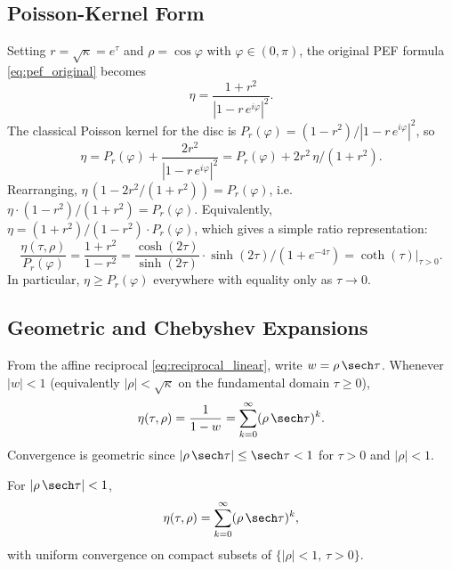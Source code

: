 \subsection{Poisson-Kernel Form}

Setting $r = \sqrt{\kappa} = e^{\tau}$ and $\rho = \cos\varphi$ with $\varphi \in (0,\pi)$, the original PEF formula \cref{eq:pef_original} becomes
\begin{equation}
  \eta = \frac{1 + r^{2}}{|1 - r\,e^{i\varphi}|^{2}}.
  \label{eq:poisson_form}
\end{equation}
The classical Poisson kernel for the disc is $P_{r}(\varphi) = (1-r^{2})/|1-r\,e^{i\varphi}|^{2}$, so
\begin{equation}
  \eta = P_{r}(\varphi) + \frac{2r^{2}}{|1-r\,e^{i\varphi}|^{2}}
       = P_{r}(\varphi) + 2r^{2}\,\eta/(1+r^{2}).
  \label{eq:poisson_decomposition}
\end{equation}
Rearranging, $\eta\,(1-2r^{2}/(1+r^{2})) = P_{r}(\varphi)$, i.e.\ $\eta \cdot (1-r^{2})/(1+r^{2}) = P_{r}(\varphi)$.  Equivalently, $\eta = (1+r^{2})/(1-r^{2})\cdot P_{r}(\varphi)$, which gives a simple ratio representation:
\begin{equation}
  \frac{\eta(\tau,\rho)}{P_{r}(\varphi)}
  = \frac{1+r^{2}}{1-r^{2}}
  = \frac{\cosh(2\tau)}{\sinh(2\tau)}\cdot\sinh(2\tau)/(1+e^{-4\tau})
  = \coth(\tau)\big|_{\tau>0}.
  \label{eq:eta_poisson_ratio}
\end{equation}
In particular, $\eta \ge P_{r}(\varphi)$ everywhere with equality only as $\tau \to 0$.

\subsection{Geometric and Chebyshev Expansions}
\label{sec:chebyshev}

From the affine reciprocal \cref{eq:reciprocal_linear}, write $w = \rho\,\sech\tau$.  Whenever $|w| < 1$ (equivalently $|\rho| < \sqrt{\kappa}$ on the fundamental domain $\tau \ge 0$),
\begin{equation}
  \eta(\tau,\rho)
  = \frac{1}{1-w}
  = \sum_{k=0}^{\infty}(\rho\,\sech\tau)^{k}.
  \label{eq:geometric_series}
\end{equation}
Convergence is geometric since $|\rho\,\sech\tau| \le \sech\tau < 1$ for $\tau > 0$ and $|\rho| < 1$.

\begin{proposition}
\label{prop:geometric_series}
For $|\rho\,\sech\tau| < 1$,
\begin{equation}
  \eta(\tau,\rho) = \sum_{k=0}^{\infty}(\rho\,\sech\tau)^{k},
  \label{eq:chebyshev_exp}
\end{equation}
with uniform convergence on compact subsets of $\{|\rho| < 1,\,\tau > 0\}$.
\end{proposition}


